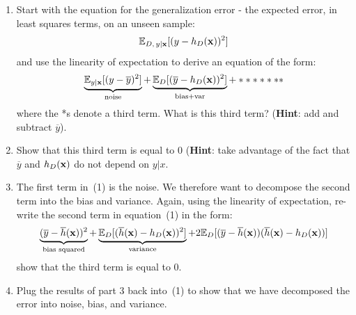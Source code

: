 \documentclass[12pt,letterpaper]{article}
\begin{document}
\begin{enumerate}
    \item Start with the equation for the generalization error - the expected error, in least squares terms, on an unseen sample:
    \begin{align}
        \mathbb{E}_{D, \, y|\mathbf{x}}[(y-h_D(\mathbf{x}))^2]\notag
    \end{align}
    and use the linearity of expectation to derive an equation of the form:
    \begin{align}
        \underbrace{\mathbb{E}_{y|\mathbf{x}}[(y-\overline{y})^2]}_\text{noise}
+\underbrace{\mathbb{E}_D[(\overline{y}-h_D(\mathbf{x}))^2]}_\text{bias+var}
+ *******
    \end{align}{}
    where the *s denote a third term. What is this third term? (\textbf{Hint}: add and subtract $\overline{y}$).
    \item
    Show that this third term is equal to 0 (\textbf{Hint}: take advantage of the fact that $\overline{y}$ and $h_D(\mathbf{x})$ do not depend on $y|x$.
    \item
    The first term in~(1) is the noise. We therefore want to decompose the second term into the bias and variance. Again, using the linearity of expectation, re-write the second term in equation~(1) in the form:
    \begin{align}
        \underbrace{(\overline{y}-\overline{h}(\mathbf{x}))^2}_\text{bias squared}+\underbrace{\mathbb{E}_D[(\overline{h}(\mathbf{x})-h_D(\mathbf{x}))^2]}_\text{variance}
+2\mathbb{E}_D[(\overline{y}-\overline{h}(\mathbf{x}))(\overline{h}(\mathbf{x})-h_D(\mathbf{x}))]
    \end{align}
    show that the third term is equal to 0.
    \item
    Plug the results of part 3 back into~(1) to show that we have decomposed the error into noise, bias, and variance.
    
\newpage
    
\end{enumerate}
\end{document}
